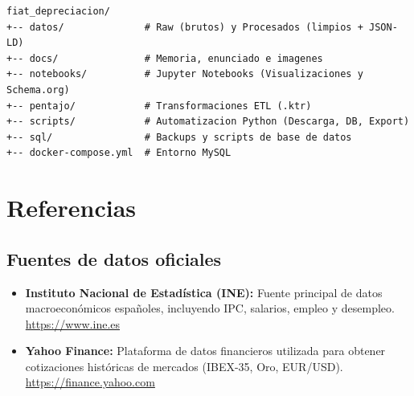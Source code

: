 \documentclass{article}
\begin{document}
\begin{lstlisting}
fiat_depreciacion/
+-- datos/              # Raw (brutos) y Procesados (limpios + JSON-LD)
+-- docs/               # Memoria, enunciado e imagenes
+-- notebooks/          # Jupyter Notebooks (Visualizaciones y Schema.org)
+-- pentajo/            # Transformaciones ETL (.ktr)
+-- scripts/            # Automatizacion Python (Descarga, DB, Export)
+-- sql/                # Backups y scripts de base de datos
+-- docker-compose.yml  # Entorno MySQL
\end{lstlisting}

\section{Referencias}

\subsection{Fuentes de datos oficiales}

\begin{itemize}
    \item \textbf{Instituto Nacional de Estad\'istica (INE):} Fuente principal de datos macroecon\'omicos espa\~noles, incluyendo IPC, salarios, empleo y desempleo.\\
    \url{https://www.ine.es}
    
    \item \textbf{Yahoo Finance:} Plataforma de datos financieros utilizada para obtener cotizaciones hist\'oricas de mercados (IBEX-35, Oro, EUR/USD).\\
    \url{https://finance.yahoo.com}
\end{itemize}
\end{document}
